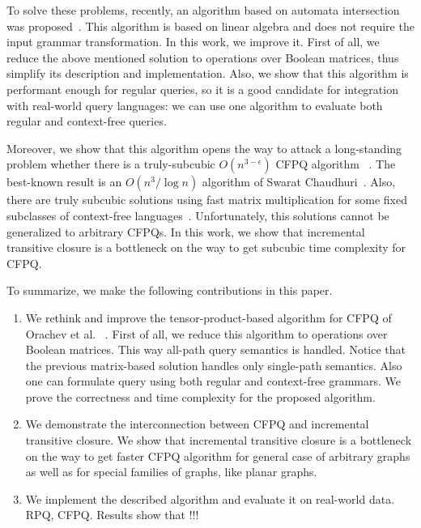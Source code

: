 To solve these problems, recently, an algorithm based on automata intersection was proposed~\cite{10.1007/978-3-030-54832-2_6}.
This algorithm is based on linear algebra and does not require the input grammar transformation.
In this work, we improve it.
First of all, we reduce the above mentioned solution to operations over Boolean matrices, thus simplify its description and implementation.
Also, we show that this algorithm is performant enough for regular queries, so it is a good candidate for integration with real-world query languages: we can use one algorithm to evaluate both regular and context-free queries. 

Moreover, we show that this algorithm opens the way to attack a long-standing problem whether there is a truly-subcubic $O(n^{3-\epsilon})$ CFPQ algorithm ~\cite{10.1145/1328438.1328460, Yannakakis}. 
The best-known result is an $O(n^3/\log{n})$ algorithm of Swarat Chaudhuri~\cite{10.1145/1328438.1328460}. 
Also, there are truly subcubic solutions using fast matrix multiplication for some fixed subclasses of context-free languages~\cite{8249039}. 
Unfortunately, this solutions cannot be generalized to arbitrary CFPQs. 
In this work, we show that incremental transitive closure is a bottleneck on the way to get subcubic time complexity for CFPQ.

To summarize, we make the following contributions in this paper.
\begin{enumerate}
	\item We rethink and improve the tensor-product-based algorithm for CFPQ of Orachev et al. ~\cite{10.1007/978-3-030-54832-2_6}. First of all, we reduce this algorithm to operations over Boolean matrices. This way all-path query semantics is handled. Notice that the previous matrix-based solution handles only single-path semantics. Also one can formulate query using both regular and context-free grammars. We prove the correctness and time complexity for the proposed algorithm.
	\item We demonstrate the interconnection between CFPQ and incremental transitive closure. We show that incremental transitive closure is a bottleneck on the way to get faster CFPQ algorithm for general case of arbitrary graphs as well as for special families of graphs, like planar graphs.
	\item We implement the described algorithm and evaluate it on real-world data. RPQ, CFPQ. Results show that !!!
\end{enumerate}